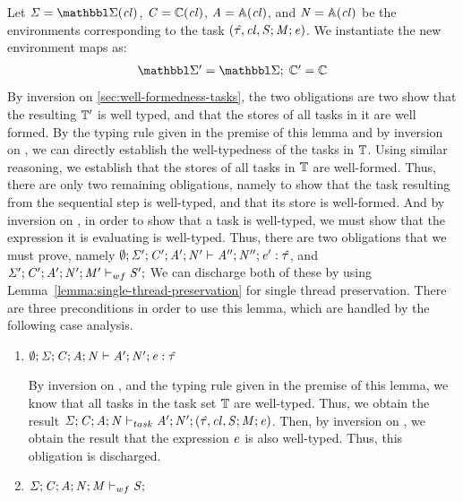 \begin{bproof}
\begin{bcase}[\dregparsteptask{}]
Let $\SENV = \SENVMAP(\concretelocvar)$,
$\mathit{C} = \mathbb{C}(\mathit{cl})$,
$\mathit{A} = \mathbb{A}(\mathit{cl})$, and
$\mathit{N} = \mathbb{A}(\mathit{cl})$
be the environments corresponding to the task
$(\mathit{\hat{\tau}}, \mathit{cl}{}, \mathit{S};\mathit{M};\mathit{e})$.
%
We instantiate the new environment maps as:
%
\[
\begin{array}{l}
\SENVMAP' = \SENVMAP ; \;
\CENVMAP' = \CENVMAP
\end{array}
\]
%
By inversion on \ref{sec:well-formedness-tasks},
the two obligations are two show that the resulting $\mathbb{T}'$ is well typed,
and that the stores of all tasks in it are well formed.
%
By the typing rule given in the premise of this lemma
and by inversion on \ttaskset{},
we can directly establish the well-typedness of the tasks in $\mathbb{T}$.
%
Using similar reasoning, we establish that the stores of all tasks in $\mathbb{T}$
are well-formed.
%
Thus, there are only two remaining obligations, namely
to show that the task resulting from the sequential step is well-typed,
and that its store is well-formed.
%
And by inversion on \ttask{}, in order to show that a task is well-typed,
we must show that the expression it is evaluating is well-typed.
%
Thus, there are two obligations that we must prove, namely
%
$\emptyset;\mathit{\Sigma}';\mathit{C}';\mathit{A}';\mathit{N}' \vdash \mathit{A}'';\mathit{N}'';\mathit{e}' : \mathit{\hat{\tau}}$, and
$\storewf{\SENV'}{\CENV'}{\AENV'}{\NENV'}{\MENV'}{\STOR'}$
%
We can discharge both of these by using
Lemma~\ref{lemma:single-thread-preservation}
for single thread preservation.
%
There are three preconditions in order to use this lemma, which are
handled by the following case analysis.

\begin{enumerate}

\item $\emptyset;\mathit{\Sigma};\mathit{C};\mathit{A};\mathit{N} \vdash \mathit{A}';\mathit{N}';\mathit{e} : \mathit{\hat{\tau}}$

By inversion on \ttaskset{}, and the typing rule given in the premise of this lemma,
we know that all tasks in the task set $\mathbb{T}$ are well-typed.
%
Thus, we obtain the result
$\mathit{\Sigma};\mathit{C};\mathit{A};\mathit{N} \vdash_{task} \mathit{A}'; \mathit{N}'; (\mathit{\hat{\tau}}, \mathit{cl}{}, \mathit{S};\mathit{M};\mathit{e})$.
%
Then, by inversion on \ttask{}, we obtain the result that the expression
$\mathit{e}$ is also well-typed.
%
Thus, this obligation is discharged.

\item $\storewf{\SENV}{\CENV}{\AENV}{\NENV}{\MENV}{\STOR}$


\end{enumerate}
\end{bcase}
\end{bproof}
